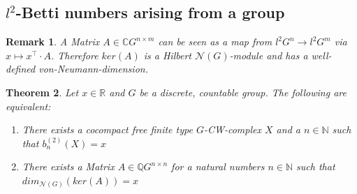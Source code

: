 \documentclass[12pt,a4paper]{scrartcl}
\newtheorem{Theorem}{Theorem}[section]
\newtheorem{Remark}[Theorem]{Remark}
\numberwithin{equation}{section}
\newcommand{\C}{\mathbb{C}} %
\newcommand{\R}{\mathbb{R}} %
\newcommand{\Q}{\mathbb{Q}} %
\newcommand{\N}{\mathbb{N}} %
\newcommand{\2}{\mathbb{Z} / 2 \mathbb{Z}}
\newcommand{\1}{\overline{1}}
\newcommand{\0}{\overline{0}}
\begin{document}
\subsection{$l^2$-Betti numbers arising from a group}
\begin{Remark}\label{MAB}
	A Matrix $A \in \C G^{n \times m}$ can be seen as a map from $l^2G^n \to l^2G^m$ via $x \mapsto x^{\top} \cdot A$. Therefore $ker(A)$ is a Hilbert $\mathcal{N}(G)$-module and has a well-defined von-Neumann-dimension. 
\end{Remark}
\begin{Theorem}
	Let $x \in \R$ and $G$ be a discrete, countable group. The following are equivalent:
	\begin{enumerate}
		\item There exists a cocompact free finite type $G$-CW-complex $X$ and a $n \in \N$ such that $b_n^{(2)}(X)=x$
		\item There exists a Matrix $A \in \Q G^{n \times n}$ for a natural numbers $n \in \N$ such that \newline $dim_{\mathcal{N}(G)}(ker (A))=x$
	\end{enumerate}
\end{Theorem}
\end{document}
